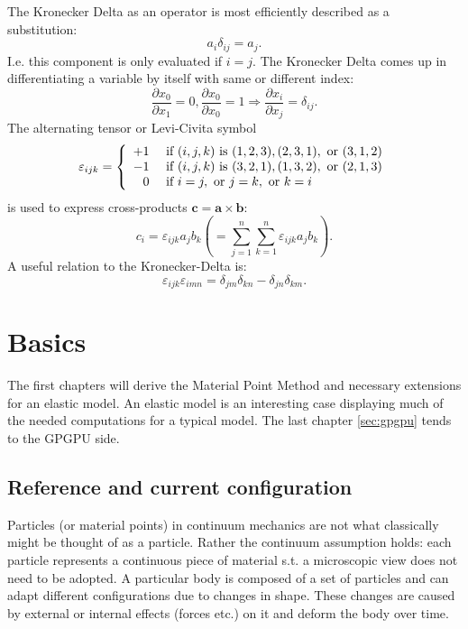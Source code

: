 \documentclass[m,times]{cgMA}
\begin{document}
The Kronecker Delta as an operator is most efficiently described as a substitution:
\begin{equation}
  a _ { i } \delta _ { i j } = a _ { j }.
\end{equation}
I.e. this component is only evaluated if $i = j$. The Kronecker Delta comes up in differentiating a variable by itself with same or different index:
\begin{equation}
  \frac{\partial{x_0}}{\partial{x_1}}=0, \frac{\partial{x_0}}{\partial{x_0}}=1  \Rightarrow \frac{\partial{x_i}}{\partial{x_j}} = \delta_{ij}.
\end{equation}
The alternating tensor or Levi-Civita symbol
\begin{equation}
  \varepsilon _ { i j k } = \left\{ \begin{array} { r l } { + 1 } & { \text { if } ( i , j , k ) \text { is } ( 1,2,3 ) , ( 2,3,1 ) , \text { or } ( 3,1,2 ) } \\ { - 1 } & { \text { if } ( i , j , k ) \text { is } ( 3,2,1 ) , ( 1,3,2 ) , \text { or } ( 2,1,3 ) } \\ { 0 } & { \text { if } i = j , \text { or } j = k , \text { or } k = i } \end{array} \right.
\end{equation}
is used to express cross-products $\boldsymbol{c}=\boldsymbol{a} \times \boldsymbol{b}$:
\begin{equation}
  c_i = \varepsilon_{ijk} a_j b_k \left(= \sum _ { j = 1 } ^ { n } \sum _ { k = 1 } ^ { n } \varepsilon_{ijk} a_j b_k\right).
\end{equation}
A useful relation to the Kronecker-Delta is:
\begin{equation} \label{eq:compact_levi}
  \varepsilon _ { i j k } \varepsilon _ { i m n } = \delta _ { j m } \delta _ { k n } - \delta _ { j n } \delta _ { k m }.
\end{equation}
\cite{MCGINTY:CONTINUUM}
\clearpage
\section{Basics}\label{sec:basics}
The first chapters will derive the Material Point Method and necessary extensions for an elastic model. An elastic model is an interesting case displaying much of the needed computations for a typical model. The last chapter \ref{sec:gpgpu} tends to the GPGPU side.
\subsection{Reference and current configuration}\label{sec:ref_corr_config}
Particles (or material points) in continuum mechanics are not what classically might be thought of as a particle. Rather the continuum assumption holds: each particle represents a continuous piece of material s.t. a microscopic view does not need to be adopted. A particular body is composed of a set of particles and can adapt different configurations due to changes in shape. These changes are caused by external or internal effects (forces etc.) on it and deform the body over time. \cite{MIT:CONTINUUM_MECHANICS} \cite{MPM:COURSE}
\end{document}
